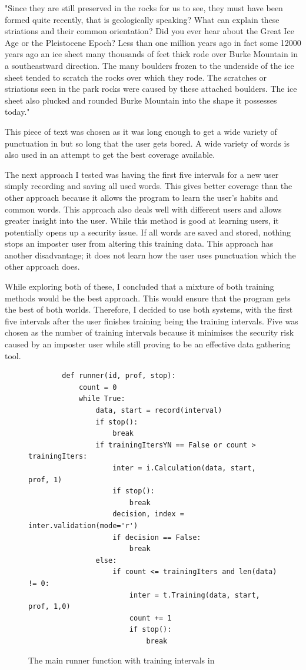 \documentclass[10pt,a4paper]{report}
\begin{document}
"Since they are still preserved in the rocks for us to see, they must have been formed quite recently, that is geologically speaking?
What can explain these striations and their common orientation?			
Did you ever hear about the Great Ice Age or the Pleistocene Epoch?			
Less than one million years ago	in fact	some 12000 years ago an ice sheet many thousands of feet thick rode over Burke Mountain in a southeastward direction.
The many boulders frozen to the underside of the ice sheet tended to scratch the rocks over which they rode.			
The scratches or striations seen in the park rocks were caused by these attached boulders.				
The ice sheet also plucked and rounded Burke Mountain into the shape it possesses today."

This piece of text was chosen as it was long enough to get a wide variety of punctuation in but so long that the user gets bored. A wide variety of words is also used in an attempt to get the best coverage available.

The next approach I tested was having the first five intervals for a new user simply recording and saving all used words. This gives better coverage than the other approach because it allows the program to learn the user’s habits and common words. This approach also deals well with different users and allows greater insight into the user. While this method is good at learning users, it potentially opens up a security issue. If all words are saved and stored, nothing stops an imposter user from altering this training data. This approach has another disadvantage; it does not learn how the user uses punctuation which the other approach does.

While exploring both of these, I concluded that a mixture of both training methods would be the best approach. This would ensure that the program gets the best of both worlds. Therefore, I decided to use both systems, with the first five intervals after the user finishes training being the training intervals. Five was chosen as the number of training intervals because it minimises the security risk caused by an imposter user while still proving to be an effective data gathering tool.

\begin{figure}
	\begin{lstlisting}
		def runner(id, prof, stop):
    		count = 0
    		while True:
        		data, start = record(interval)
        		if stop():
            		break
        		if trainingItersYN == False or count > trainingIters:
            		inter = i.Calculation(data, start, prof, 1)
            		if stop():
                		break
            		decision, index = inter.validation(mode='r')
           			if decision == False:
                		break
        		else:
           			if count <= trainingIters and len(data) != 0:
                		inter = t.Training(data, start, prof, 1,0)
                		count += 1
                		if stop():
                   			break
      \end{lstlisting}
      \caption{The main runner function with training intervals in}
      \label{fig:runner}
\end{figure}
\end{document}
